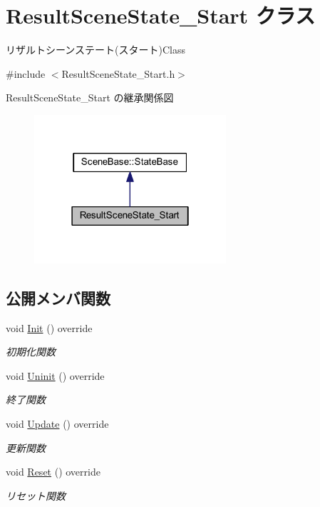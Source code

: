 \hypertarget{class_result_scene_state___start}{}\section{Result\+Scene\+State\+\_\+\+Start クラス}
\label{class_result_scene_state___start}


リザルトシーンステート(スタート)Class  




{\ttfamily \#include $<$Result\+Scene\+State\+\_\+\+Start.\+h$>$}



Result\+Scene\+State\+\_\+\+Start の継承関係図\nopagebreak
\begin{figure}[H]
\begin{center}
\leavevmode
\includegraphics[width=202pt]{class_result_scene_state___start__inherit__graph}
\end{center}
\end{figure}
\subsection*{公開メンバ関数}
\begin{DoxyCompactItemize}
\item 
void \mbox{\hyperlink{class_result_scene_state___start_a615c7e05efd2320b8956c5fd94398f55}{Init}} () override
\begin{DoxyCompactList}\small\item\em 初期化関数 \end{DoxyCompactList}\item 
void \mbox{\hyperlink{class_result_scene_state___start_af5b9af607074e3296481a1660607fb9a}{Uninit}} () override
\begin{DoxyCompactList}\small\item\em 終了関数 \end{DoxyCompactList}\item 
void \mbox{\hyperlink{class_result_scene_state___start_a2ecdef2bef0cd1a04055e8687e11199b}{Update}} () override
\begin{DoxyCompactList}\small\item\em 更新関数 \end{DoxyCompactList}\item 
void \mbox{\hyperlink{class_result_scene_state___start_a8f776a7b2d31451c434fb74ffdd65960}{Reset}} () override
\begin{DoxyCompactList}\small\item\em リセット関数 \end{DoxyCompactList}\end{DoxyCompactItemize}
